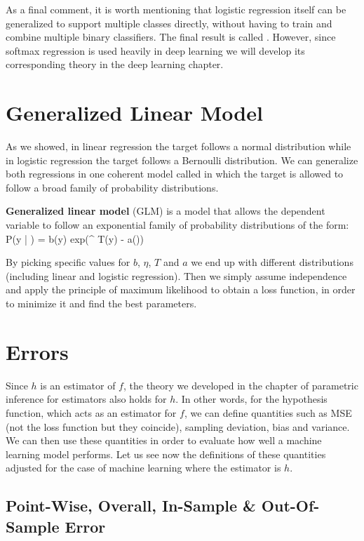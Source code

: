 As a final comment, it is worth mentioning that logistic regression itself can be generalized to support multiple
classes directly, without having to train and combine multiple binary classifiers. The final result is called
. However, since softmax regression is used heavily in deep learning we will develop its
corresponding theory in the deep learning chapter.

\section{Generalized Linear Model}

As we showed, in linear regression the target follows a normal distribution while in logistic regression the target
follows a Bernoulli distribution. We can generalize both regressions in one coherent model called  in which the target is allowed to follow a broad family of probability distributions.

\textbf{Generalized linear model} (GLM) is a model that allows the dependent variable to follow an exponential family
of probability distributions of the form:
\bse
P(y | \eta) = b(y) \cdot exp(\eta^{\intercal} T(y) - a(\eta))
\ese
\ed

By picking specific values for $b$, $\eta$, $T$ and $a$ we end up with different distributions (including linear and
logistic regression). Then we simply assume independence and apply the principle of maximum likelihood to obtain a
loss function, in order to minimize it and find the best parameters.

\section{Errors}

Since $h$ is an estimator of $f$, the theory we developed in the chapter of parametric inference for estimators also
holds for $h$. In other words, for the hypothesis function, which acts as an estimator for $f$, we can define
quantities such as MSE (not the loss function but they coincide), sampling deviation, bias and variance. We can then
use these quantities in order to evaluate how well a machine learning model performs. Let us see now the definitions
of these quantities adjusted for the case of machine learning where the estimator is $h$.

\subsection{Point-Wise, Overall, In-Sample \& Out-Of-Sample Error}

